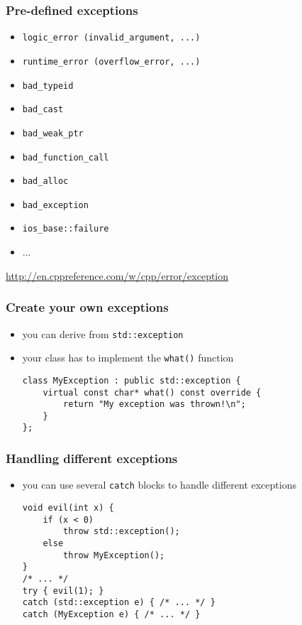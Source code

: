 \begin{frame}[fragile]
    \frametitle{Pre-defined exceptions}
    \begin{itemize}
        \item \lstinline{logic_error (invalid_argument, ...)}
        \item \lstinline{runtime_error (overflow_error, ...)}
        \item \lstinline{bad_typeid}
        \item \lstinline{bad_cast}
        \item \lstinline{bad_weak_ptr}
        \item \lstinline{bad_function_call}
        \item \lstinline{bad_alloc}
        \item \lstinline{bad_exception}
        \item \lstinline{ios_base::failure}
        \item ...
    \end{itemize}
    \href{All exceptions on cppreference}{http://en.cppreference.com/w/cpp/error/exception}
\end{frame}

\begin{frame}[fragile]
    \frametitle{Create your own exceptions}
    \begin{itemize}
    \item you can derive from \lstinline{std::exception}
    \item your class has to implement the \lstinline{what()} function
    \begin{lstlisting}[numbers=none]
class MyException : public std::exception {
    virtual const char* what() const override {
        return "My exception was thrown!\n";
    }
};
    \end{lstlisting}
    \end{itemize}
\end{frame}

\begin{frame}[fragile]
    \frametitle{Handling different exceptions}
    \begin{itemize}
    \item you can use several \lstinline{catch} blocks to handle different exceptions
    \begin{lstlisting}[numbers=none]
void evil(int x) {
    if (x < 0)
        throw std::exception();
    else
        throw MyException();
}
/* ... */
try { evil(1); } 
catch (std::exception e) { /* ... */ } 
catch (MyException e) { /* ... */ }
    \end{lstlisting}
    \end{itemize}
\end{frame}

